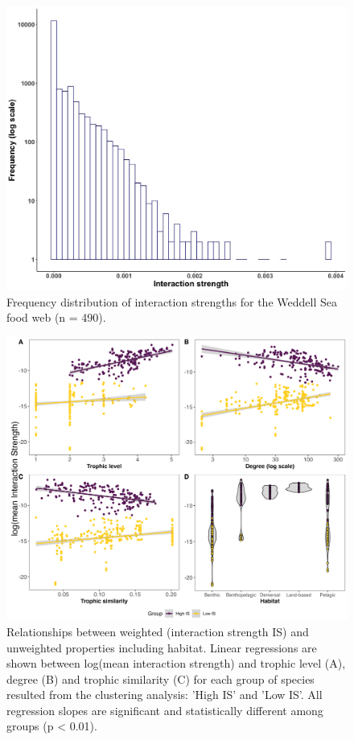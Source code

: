 \documentclass[gc, manuscript]{copernicus}
\begin{document}
\clearpage

\begin{figure}
\includegraphics[width=12cm]{Fig.4_ISDist} \caption{Frequency distribution of interaction strengths for the Weddell Sea food web (n = 490).}\label{fig:unnamed-chunk-4}
\end{figure}

\clearpage

\begin{figure}
\includegraphics[width=12cm]{Fig.5_Reg} \caption{Relationships between weighted (interaction strength IS) and unweighted properties including habitat. Linear regressions are shown between log(mean interaction strength) and trophic level (A), degree (B) and trophic similarity (C) for each group of species resulted from the clustering analysis: 'High IS' and 'Low IS'. All regression slopes are significant and statistically different among groups (p < 0.01).}\label{fig:unnamed-chunk-5}
\end{figure}
\end{document}
